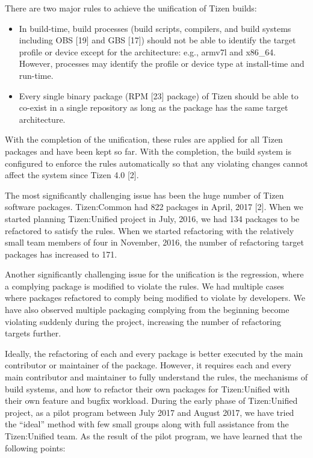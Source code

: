 There are two major rules to achieve the unification of Tizen builds:

\begin{itemize}
\item In build-time, build processes (build scripts, compilers, and build systems including OBS [19] and GBS [17]) should not be able to identify the target profile or device except for the architecture: e.g., armv7l and x86\_64. However, processes may identify the profile or device type at install-time and run-time.
\item Every single binary package (RPM [23] package) of Tizen should be able to co-exist in a single repository as long as the package has the same target architecture.
\end{itemize}

With the completion of the unification, these rules are applied for all Tizen packages and have been kept so far. With the completion, the build system is configured to enforce the rules automatically so that any violating changes cannot affect the system since Tizen 4.0 [2].


The most significantly challenging issue has been the huge number of Tizen software packages. Tizen:Common had 822 packages in April, 2017 [2]. When we started planning Tizen:Unified project in July, 2016, we had 134 packages to be refactored to satisfy the rules. When we started refactoring with the relatively small team members of four in November, 2016, the number of refactoring target packages has increased to 171.


Another significantly challenging issue for the unification is the regression, where a complying package is modified to violate the rules. We had multiple cases where packages refactored to comply being modified to violate by developers. We have also observed multiple packaging complying from the beginning become violating suddenly during the project, increasing the number of refactoring targets further.


Ideally, the refactoring of each and every package is better executed by the main contributor or maintainer of the package. However, it requires each and every main contributor and maintainer to fully understand the rules, the mechanisms of build systems, and how to refactor their own packages for Tizen:Unified with their own feature and bugfix workload. During the early phase of Tizen:Unified project, as a pilot program between July 2017 and August 2017, we have tried the “ideal” method with few small groups along with full assistance from the Tizen:Unified team. As the result of the pilot program, we have learned that the following points:


